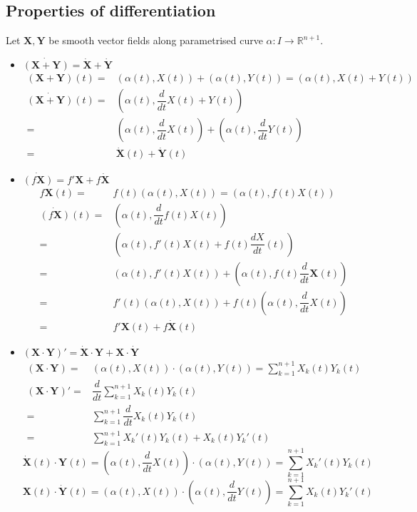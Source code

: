 \subsection{Properties of differentiation}
Let $\mathbf{X},\mathbf{Y}$ be smooth vector fields along parametrised curve $\alpha : I \to \mathbb{R}^{n+1}$.
\begin{itemize}
	\item $\dot{(\mathbf{X}+\mathbf{Y})} = \dot{\mathbf{X}} + \dot{\mathbf{Y}}$
	\begin{align*}
		(\mathbf{X}+\mathbf{Y})(t) = & (\alpha(t), X(t)) + (\alpha(t), Y(t)) = \left( \alpha(t), X(t)+Y(t) \right) \\
		\dot{(\mathbf{X}+\mathbf{Y})}(t) = & \left( \alpha(t), \dfrac{d}{dt} X(t)+Y(t) \right) \\
		= & \left( \alpha(t), \dfrac{d}{dt}X(t)\right) + \left( \alpha(t), \dfrac{d}{dt}Y(t) \right) \\
		= & \dot{\mathbf{X}}(t) + \dot{\mathbf{Y}}(t)
	\end{align*}
	\item $\dot{(f\mathbf{X})} = f'\mathbf{X} + f\dot{\mathbf{X}}$
	\begin{align*}
		f\mathbf{X}(t) = & f(t)(\alpha(t), X(t)) = (\alpha(t), f(t)X(t)) \\
		\dot{(f\mathbf{X})}(t) = & \left( \alpha(t),\dfrac{d}{dt}f(t)X(t) \right) \\
		= & \left( \alpha(t), f'(t)X(t) + f(t)\dfrac{dX}{dt}(t) \right) \\
		= & \left( \alpha(t), f'(t)X(t) \right) + \left( \alpha(t), f(t)\dfrac{d}{dt} \mathbf{X}(t) \right)\\
		= & f'(t) \left( \alpha(t),X(t) \right) + f(t) \left( \alpha(t),\dfrac{d}{dt} X(t) \right)\\
		= & f'\mathbf{X}(t) + f\dot{\mathbf{X}}(t)
	\end{align*}
	\item $(\mathbf{X} \cdot \mathbf{Y})' = \dot{\mathbf{X}} \cdot \mathbf{Y} + \mathbf{X} \cdot \dot{\mathbf{Y}}$
	\begin{align*}
		(\mathbf{X} \cdot \mathbf{Y}) = & (\alpha(t), X(t)) \cdot (\alpha(t),Y(t)) = \sum_{k = 1}^{n+1} X_k(t)Y_k(t) \\
		(\mathbf{X} \cdot \mathbf{Y})' = & \dfrac{d}{dt} \sum_{k = 1}^{n+1} X_k(t)Y_k(t) \\
		= & \sum_{k = 1}^{n+1} \dfrac{d}{dt}X_k(t)Y_k(t)\\
		= & \sum_{k = 1}^{n+1} X_k'(t)Y_k(t) + X_k(t)Y_k'(t)
	\end{align*}
	$$\dot{\mathbf{X}}(t) \cdot \mathbf{Y}(t) =  \left( \alpha(t), \dfrac{d}{dt}X(t) \right) \cdot \left( \alpha(t), Y(t) \right) =  \sum_{k=1}^{n+1} X_k'(t)Y_k(t)$$
		$$\mathbf{X}(t) \cdot \dot{\mathbf{Y}}(t) =  \left( \alpha(t), X(t) \right) \cdot \left( \alpha(t), \dfrac{d}{dt}Y(t) \right) =  \sum_{k=1}^{n+1} X_k(t)Y_k'(t)$$
\end{itemize}

